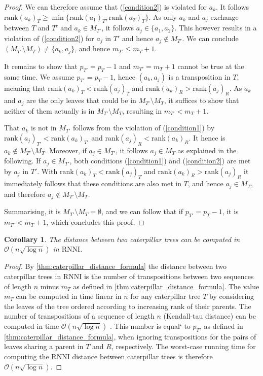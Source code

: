 \documentclass[11pt]{amsart}
\newtheorem{corollary}{Corollary}
\newcommand{\rnni}{\mathrm{RNNI}}
\newcommand{\rank}{\mathrm{rank}}
\renewcommand{\O}{\mathcal O}
\begin{document}
\begin{proof}
	We can therefore assume that (\ref{condition2}) is violated for $a_k$.
	It follows $\rank(a_k)_T \geq \min\{\rank(a_1)_T, \rank(a_2)_T\}$.
	As only $a_k$ and $a_j$ exchange between $T$ and $T'$ and $a_k \in M_{T'}$, it follows $a_j \in \{a_1, a_2\}$.
	This however results in a violation of (\ref{condition2}) for $a_j$ in $T'$ and hence $a_j \notin M_{T'}$.
	We can conclude $(M_{T'} \setminus M_T) \neq \{a_k, a_j\}$, and hence $m_{T'} \leq m_T + 1$.

	It remains to show that $p_{T'} = p_T - 1$ and $m_{T'} = m_T + 1$ cannot be true at the same time.
	We assume $p_{T'} = p_T - 1$, hence $(a_k,a_j)$ is a transposition in $T$, meaning that $\rank(a_k)_T < \rank(a_j)_T$ and $\rank(a_k)_R > \rank(a_j)_R$.
	As $a_k$ and $a_j$ are the only leaves that could be in $M_{T'} \setminus M_T$, it suffices to show that neither of them actually is in $M_{T'} \setminus M_T$, resulting in $m_{T'} < m_T + 1$.

	That $a_k$ is not in $M_{T'}$ follows from the violation of (\ref{condition1}) by $\rank(a_j)_{T'} < \rank(a_k)_{T'}$ and $\rank(a_j)_R < \rank(a_k)_R$.
	It hence is $a_k \notin M_{T'} \setminus M_T$.
	Moreover, if $a_j \in M_{T'}$, it follows $a_j \in M_T$ as explained in the following.
	If $a_j \in M_{T'}$, both conditions (\ref{condition1}) and (\ref{condition2}) are met by $a_j$ in $T'$.
	With $\rank(a_k)_T < \rank(a_j)_T$ and $\rank(a_k)_R > \rank(a_j)_R$ it immediately follows that these conditions are also met in $T$, and hence $a_j \in M_T$, and therefore $a_j \notin M_{T'} \setminus M_T$.

	Summarising, it is $M_{T'} \setminus M_T = \emptyset$, and we can follow that if $p_{T'} = p_T - 1$, it is $m_{T'} < m_T + 1$, which concludes this proof.
\end{proof}

\begin{corollary}
	The distance between two caterpillar trees can be computed in $\O(n \sqrt{\log n})$ in $\rnni$.
	\label{cor:caterpillar_distance_rnni_nlogn}
\end{corollary}

\begin{proof}
	By \autoref{thm:caterpillar_distance_formula} the distance between two caterpillar trees in $\rnni$ is the number of transpositions between two sequences of length $n$ minus $m_T$ as defined in \autoref{thm:caterpillar_distance_formula}.
	The value $m_T$ can be computed in time linear in $n$ for any caterpillar tree $T$ by considering the leaves of the tree ordered according to increasing rank of their parents.
	The number of transpositions of a sequence of length $n$ (Kendall-tau distance) can be computed in time $\O(n \sqrt{\log n})$ \autocite{Chan2010-ls}.
	This number is equal` to $p_T$, as defined in \autoref{thm:caterpillar_distance_formula}, when ignoring transpositions for the pairs of leaves sharing a parent in $T$ and $R$, respectively.
	The worst-case running time for computing the $\rnni$ distance between caterpillar trees is therefore $\O(n \sqrt{\log n})$.
\end{proof}
\end{document}
